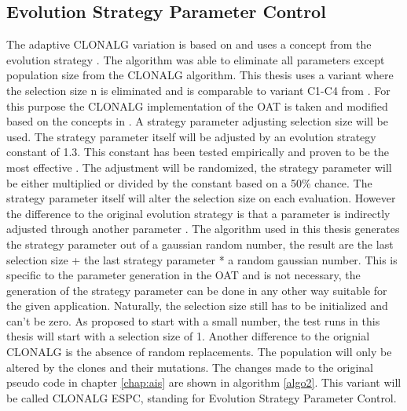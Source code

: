 \subsection{Evolution Strategy Parameter Control}
\label{espc}
The adaptive CLONALG variation is based on \cite{Garret04} and uses a concept from the evolution strategy \cite{evolution}. The algorithm was able to eliminate all parameters except population size from the CLONALG algorithm. This thesis uses a variant where the selection size n is eliminated and is comparable to variant C1-C4 from \cite{Garret04}. For this purpose the CLONALG implementation of the OAT is taken and modified based on the concepts in \cite{Garret04}. A strategy parameter adjusting selection size will be used. The strategy parameter itself will be adjusted by an evolution strategy constant of 1.3. This constant has been tested empirically and proven to be the most effective \cite{Garret04}. The adjustment will be randomized, the strategy parameter will be either multiplied or divided by the constant based on a 50\% chance. The strategy parameter itself will alter the selection size on each evaluation. However the difference to the original evolution strategy is that a parameter is indirectly adjusted through another parameter \cite{Garret04}. The algorithm used in this thesis generates the strategy parameter out of a gaussian random number, the result are the last selection size + the last strategy parameter * a random gaussian number. This is specific to the parameter generation in the OAT and is not necessary, the generation of the strategy parameter can be done in any other way suitable for the given application.  Naturally, the selection size still has to be initialized and can't be zero. As \cite{Garret04} proposed to start with a small number, the test runs in this thesis will start with a selection size of 1. Another difference to the orignial CLONALG is the absence of random replacements. The population will only be altered by the clones and their mutations. The changes made to the original pseudo code in chapter \ref{chap:ais} are shown in algorithm \ref{algo2}. This variant will be called CLONALG ESPC, standing for Evolution Strategy Parameter Control.\\\\
